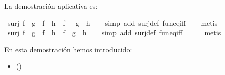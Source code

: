\begin{isabellebody}
\begin{isamarkuptext}
La demostración aplicativa es:%
\end{isamarkuptext}\isamarkuptrue%
\isamarkupfalse%
\ {\isachardoublequoteopen}surj\ f\ {\isasymLongrightarrow}\ {\isacharparenleft}{\isacharparenleft}g\ {\isasymcirc}\ f{\isacharparenright}\ {\isacharequal}\ {\isacharparenleft}h\ {\isasymcirc}\ f{\isacharparenright}\ {\isacharparenright}\ {\isasymlongrightarrow}\ {\isacharparenleft}g\ {\isacharequal}\ h{\isacharparenright}{\isachardoublequoteclose}\isanewline
%
\isadelimproof
\ \ %
\endisadelimproof
%
\isatagproof
{}\isamarkupfalse%
\ {\isacharparenleft}simp\ add{\isacharcolon}\ surj{\isacharunderscore}def\ fun{\isacharunderscore}eq{\isacharunderscore}iff{\isacharparenright}\isanewline
\ \ \isamarkupfalse%
\ metis\isanewline
\ \ \isamarkupfalse%
%
\endisatagproof
{\isafoldproof}%
%
\isadelimproof
\isanewline
%
\endisadelimproof
\isanewline
{}\isamarkupfalse%
\ {\isachardoublequoteopen}surj\ f\ {\isasymLongrightarrow}\ {\isacharparenleft}{\isacharparenleft}g\ {\isasymcirc}\ f{\isacharparenright}\ {\isacharequal}\ {\isacharparenleft}h\ {\isasymcirc}\ f{\isacharparenright}\ {\isacharparenright}\ {\isasymlongrightarrow}{\isacharparenleft}g\ {\isacharequal}\ h{\isacharparenright}{\isachardoublequoteclose}\isanewline
%
\isadelimproof
\ \ %
\endisadelimproof
%
\isatagproof
{}\isamarkupfalse%
\ {\isacharparenleft}simp\ add{\isacharcolon}\ surj{\isacharunderscore}def\ fun{\isacharunderscore}eq{\isacharunderscore}iff\ {\isacharparenright}\ \isanewline
\ \ \isamarkupfalse%
\ metis%
\endisatagproof
{\isafoldproof}%
%
\isadelimproof
%
\endisadelimproof
%
\begin{isamarkuptext}%
En esta demostración hemos introducido:
 \begin{itemize}
    \item[]  
      \hfill ()
  \end{itemize}%
\end{isamarkuptext}\isamarkuptrue%
%
\isadelimtheory
%
\endisadelimtheory
%
\isatagtheory
%
\endisatagtheory
{\isafoldtheory}%
%
\isadelimtheory
%
\endisadelimtheory
%
\end{isabellebody}%
